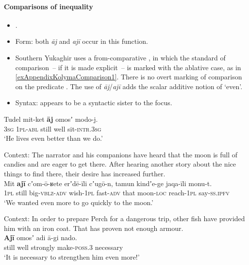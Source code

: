 \paragraph{Comparisons of inequality}\label{appendixKolymaComparisons}
\begin{itemize}
	\item \textcite[364]{Maslova2003}.
	\item Form: both \textit{āj} and \textit{ajī} occur in this function.
	\item Southern Yukaghir uses a from-comparative \parencite{Stassen2013}, in which the standard of comparison~-- if it is made explicit~-- is marked with the ablative case, as in \ref{exAppendixKolymaComparison1}. There is no overt marking of comparison on the predicate \parencite[364]{Maslova2003}. The use of  \textit{āj}/\textit{ajī} adds the scalar additive notion of \lq even\rq{}.
	\item Syntax: appears to be a syntactic sister to the focus.
\end{itemize}

\begin{exe}
	\ex\label{exAppendixKolymaComparison1}
	\gll Tudel mit-ket \textbf{āj} omosʼ modo-j.\\
	3\textsc{sg} 1\textsc{pl}-\textsc{abl} still well sit-\textsc{intr}.3\textsc{sg}\\
	\glt \lq He lives even better than we do.' \parencite[364]{Maslova2003}

	\ex 
	Context: The narrator and his companions have heard that the moon is full of candies and are eager to get there. After hearing another story about the nice things to find there, their desire has increased further.\\
	\gll  Mit \textbf{ajī} cʼom-ō-ʁete erʼdē-īli cʼugō-n, tamun kindʼe-ge jaqa-īli monu-t.\\
	1\textsc{pl} still big-\textsc{vblz}-\textsc{adv} wish-1\textsc{pl} fast-\textsc{adv} that moon-\textsc{loc} reach-1\textsc{pl} say-\textsc{ss}.\textsc{ipfv}\\
	\glt \lq We wanted even more to go quickly to the moon.' \parencite[Text 50]{NikolaevaMayer2004}
	
	\ex
	Context: In order to prepare Perch for a dangerous trip, other fish have provided him with an iron coat. That has proven not enough armour.\\
	\gll \textbf{Ajī} omosʼ adi ā-gi nado.\\
	still well strongly make-\textsc{poss}.3 necessary\\
	\glt \lq It is necessary to strengthen him even more!' \parencite[565, 573]{Maslova2003}
	

\end{exe}

